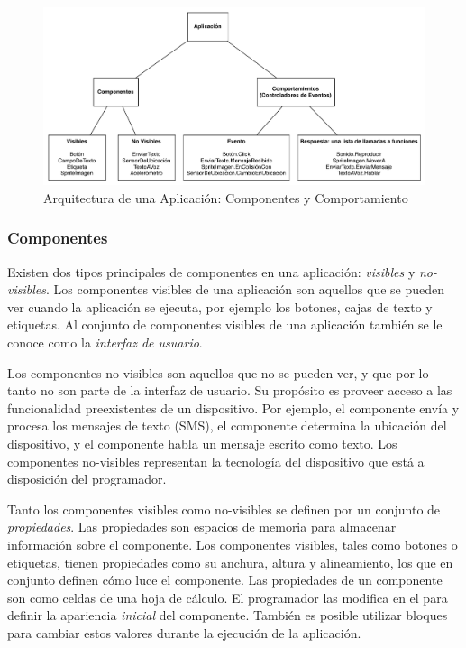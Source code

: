 \documentclass[letterpaper]{article}
\begin{document}
\begin{figure}[H]
\centering
\includegraphics[scale=0.5]{figures/AppArchitecture}
\caption{Arquitectura de una Aplicación: Componentes y Comportamiento}
\label{fig:appArchitecture}
\end{figure}

\subsubsection*{Componentes}

Existen dos tipos principales de componentes en una aplicación:
\emph{visibles} y \emph{no-visibles}. Los componentes visibles de una
aplicación son aquellos que se pueden ver cuando la aplicación se
ejecuta, por ejemplo los botones, cajas de texto y etiquetas. Al
conjunto de componentes visibles de una aplicación también se le
conoce como la \emph{interfaz de usuario}.

Los componentes no-visibles son aquellos que no se pueden ver, y que
por lo tanto no son parte de la interfaz de usuario. Su propósito es
proveer acceso a las funcionalidad preexistentes de un
dispositivo. Por ejemplo, el componente  envía
y procesa los mensajes de texto (SMS), el componente
 determina la ubicación del dispositivo,
y el componente  habla un mensaje escrito como
texto. Los componentes no-visibles representan la tecnología del
dispositivo que está a disposición del programador.

Tanto los componentes visibles como no-visibles se definen por un
conjunto de \emph{propiedades}. Las propiedades son espacios de
memoria para almacenar información sobre el componente. Los
componentes visibles, tales como botones o etiquetas, tienen
propiedades como su anchura, altura y alineamiento, los que en
conjunto definen cómo luce el componente.
%
Las propiedades de un componente son como celdas de una hoja de
cálculo. El programador las modifica en el \componentDesigner para
definir la apariencia \emph{inicial} del componente. También es
posible utilizar bloques para cambiar estos valores durante la
ejecución de la aplicación.
\end{document}
